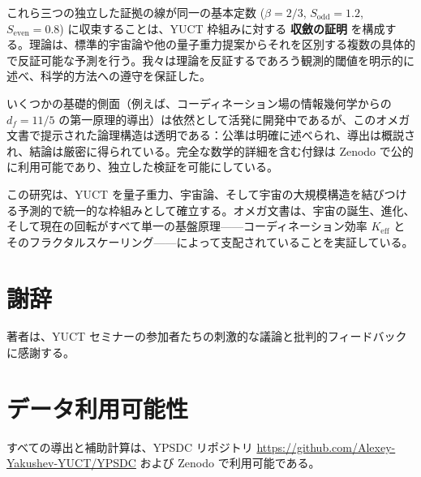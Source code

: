 \documentclass[11pt,a4paper]{article}
\begin{document}
	これら三つの独立した証拠の線が同一の基本定数 (\(\beta = 2/3\), \(S_{\mathrm{odd}}=1.2\), \(S_{\mathrm{even}}=0.8\)) に収束することは、YUCT 枠組みに対する \textbf{収斂の証明} を構成する。理論は、標準的宇宙論や他の量子重力提案からそれを区別する複数の具体的で反証可能な予測を行う。我々は理論を反証するであろう観測的閾値を明示的に述べ、科学的方法への遵守を保証した。
	
	いくつかの基礎的側面（例えば、コーディネーション場の情報幾何学からの \(d_f = 11/5\) の第一原理的導出）は依然として活発に開発中であるが、このオメガ文書で提示された論理構造は透明である：公準は明確に述べられ、導出は概説され、結論は厳密に得られている。完全な数学的詳細を含む付録は Zenodo で公的に利用可能であり、独立した検証を可能にしている。
	
	この研究は、YUCT を量子重力、宇宙論、そして宇宙の大規模構造を結びつける予測的で統一的な枠組みとして確立する。オメガ文書は、宇宙の誕生、進化、そして現在の回転がすべて単一の基盤原理——コーディネーション効率 \(K_{\mathrm{eff}}\) とそのフラクタルスケーリング——によって支配されていることを実証している。
	
	
	\section*{謝辞}
	
	著者は、YUCT セミナーの参加者たちの刺激的な議論と批判的フィードバックに感謝する。
	
	\section*{データ利用可能性}
	
	すべての導出と補助計算は、YPSDC リポジトリ \url{https://github.com/Alexey-Yakushev-YUCT/YPSDC} および Zenodo \cite{AppendixL,AppendixY,AppendixP,AppendixM,AppendixΩ,AppendixB} で利用可能である。
	
\end{document}
